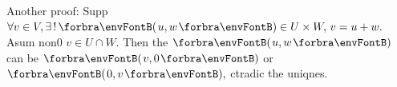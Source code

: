 
\BulletPointX\NoteForSmall{[1.45]}\;\;Another proof: Supp $\forall v\in V,\exists\,!\,\Par{u,w}\in U\times W,\,v=u+w.$\TextB{}
\Blind{\NoteForSmall{[1.45]}\;\;}Asum non0 $v\in U\cap W.$ Then the $\Par{u,w}$ can be $\Par{v,0}$ or $\Par{0,v},$ ctradic the uniqnes.\vspace{-2pt}
\SepLine




